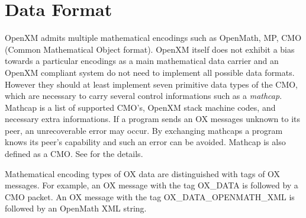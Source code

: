 
\section{Data Format}   

OpenXM admits multiple mathematical encodings such as OpenMath, MP, CMO
(Common Mathematical Object format).
OpenXM itself does not exhibit a bias towards a particular encodings 
as a main mathematical data carrier and an OpenXM compliant system do not need to
implement all possible data formats.
However  they should at least implement seven primitive 
data types of the CMO, which are necessary to 
carry several control informations such as a {\it mathcap}.
Mathcap is a list of supported CMO's, OpenXM stack machine codes, 
and necessary extra informations.
If a program sends an OX messages unknown to its peer, 
an unrecoverable error may occur. 
By exchanging mathcaps a program knows its peer's capability 
and such an error can be avoided.
Mathcap is also defined as a CMO.
See \cite{noro-takayama} for the details.

Mathematical encoding types of OX data are distinguished with tags
of OX messages.
For example,
an OX message with the tag 
OX\_DATA is followed by a CMO packet.
An OX message with the tag 
OX\_DATA\_OPENMATH\_XML is followed by 
an OpenMath XML string.

